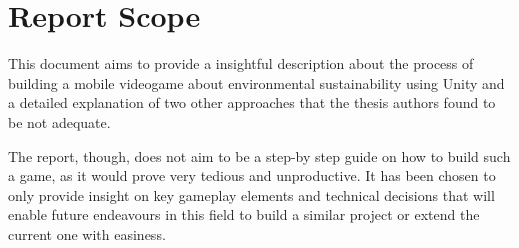 \section{Report Scope}

This document aims to provide a insightful description about the process of
building a mobile videogame about environmental sustainability using Unity
and a detailed explanation of two other approaches that the thesis authors
found to be not adequate.

The report, though, does not aim to be a step-by step guide on how to build such
a game, as it would prove very tedious and unproductive. It has been chosen
to only provide insight on key gameplay elements and technical decisions that
will enable future endeavours in this field to build a similar project
or extend the current one with easiness.
